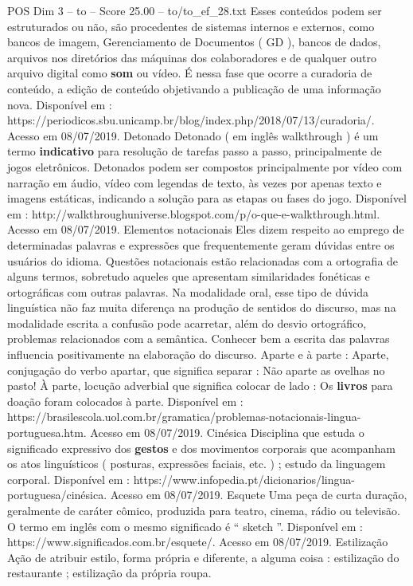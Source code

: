 \begin{textsample}{POS Dim 3 – to – Score 25.00 – to/to\_ef\_28.txt}
Esses conteúdos podem ser estruturados ou não, são procedentes de sistemas internos e externos, como bancos de imagem, Gerenciamento de Documentos ( GD ), bancos de dados, arquivos nos diretórios das máquinas dos colaboradores e de qualquer outro arquivo digital como \textbf{som} ou vídeo.
É nessa fase que ocorre a curadoria de conteúdo, a edição de conteúdo objetivando a publicação de uma informação nova.
Disponível em : https://periodicos.sbu.unicamp.br/blog/index.php/2018/07/13/curadoria/.
Acesso em 08/07/2019.
Detonado Detonado ( em inglês walkthrough ) é um termo \textbf{indicativo} para resolução de tarefas passo a passo, principalmente de jogos eletrônicos.
Detonados podem ser compostos principalmente por vídeo com narração em áudio, vídeo com legendas de texto, às vezes por apenas texto e imagens estáticas, indicando a solução para as etapas ou fases do jogo.
Disponível em : http://walkthroughuniverse.blogspot.com/p/o-que-e-walkthrough.html.
Acesso em 08/07/2019.
Elementos notacionais Eles dizem respeito ao emprego de determinadas palavras e expressões que frequentemente geram dúvidas entre os usuários do idioma.
Questões notacionais estão relacionadas com a ortografia de alguns termos, sobretudo aqueles que apresentam similaridades fonéticas e ortográficas com outras palavras.
Na modalidade oral, esse tipo de dúvida linguística não faz muita diferença na produção de sentidos do discurso, mas na modalidade escrita a confusão pode acarretar, além do desvio ortográfico, problemas relacionados com a semântica.
Conhecer bem a escrita das palavras influencia positivamente na elaboração do discurso.
Aparte e à parte : Aparte, conjugação do verbo apartar, que significa separar : Não aparte as ovelhas no pasto!
À parte, locução adverbial que significa colocar de lado : Os \textbf{livros} para doação foram colocados à parte.
Disponível em : https://brasilescola.uol.com.br/gramatica/problemas-notacionais-lingua-portuguesa.htm.
Acesso em 08/07/2019.
Cinésica Disciplina que estuda o significado expressivo dos \textbf{gestos} e dos movimentos corporais que acompanham os atos linguísticos ( posturas, expressões faciais, etc. ) ; estudo da linguagem corporal.
Disponível em : https://www.infopedia.pt/dicionarios/lingua-portuguesa/cinésica.
Acesso em 08/07/2019.
Esquete Uma peça de curta duração, geralmente de caráter cômico, produzida para teatro, cinema, rádio ou televisão.
O termo em inglês com o mesmo significado é “ sketch ”.
Disponível em : https://www.significados.com.br/esquete/.
Acesso em 08/07/2019.
Estilização Ação de atribuir estilo, forma própria e diferente, a alguma coisa : estilização do restaurante ; estilização da própria roupa.

\end{textsample}
